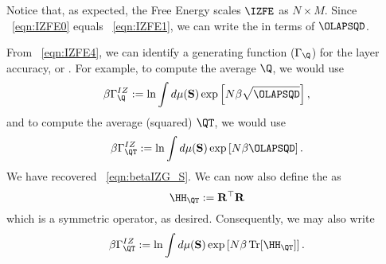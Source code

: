 Notice that, as expected, the Free Energy scales $\IZFE$ as $N \times M$.
\noindent
Since \EQN~\ref{eqn:IZFE0} equals \EQN~\ref{eqn:IZFE1}, we can write the \FreeEnergy in terms of $\OLAPSQD$. 

From \EQN~\ref{eqn:IZFE4}, 
we can identify a generating function ($\Gamma_{\Q}$) for the layer accuracy, or \Quality.
For example, to compute the average \Quality $\Q$, we would use
\begin{align}
  \label{eqn:IZG_Q}
  \beta\Gamma^{IZ}_{\Q} :=  \ln \int d\mu(\mathbf{S}) \exp\left[N\beta\sqrt{\OLAPSQD}\right],
\end{align}
and to compute the average \Quality (squared) $\QT$, we would use
\begin{align}
    \label{eqn:IZG_QT2}
  \beta\Gamma^{IZ}_{\QT} :=  \ln \int d\mu(\mathbf{S}) \exp\left[N\beta\OLAPSQD\right] .
\end{align}
We have recovered \EQN~\ref{eqn:betaIZG_S}.
We can now also define the \LayerQualitySquared \Hamiltonian as
\begin{equation}
      \label{eqn:HBARE}
  \HH_{\QT}:=\mathbf{R}^{\top}\mathbf{R}
\end{equation}
which is a symmetric operator, as desired.
Consequently, we may also write
\begin{align}
    \label{eqn:IZG_QT3}
  \beta\Gamma^{IZ}_{\QT} :=  \ln \int d\mu(\mathbf{S}) \exp\left[N\beta \operatorname{Tr}[\HH_{\QT}]\right]  .
\end{align}
